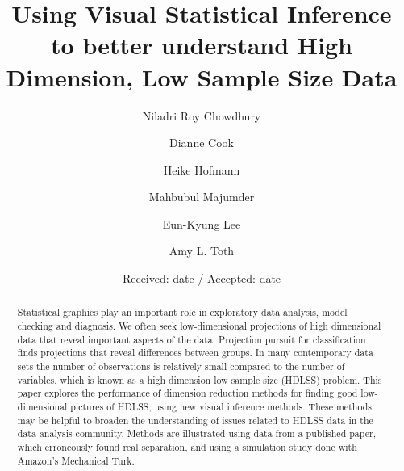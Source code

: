 \topmargin -0.10in   %
\textheight 8.5in  %






\title{Using Visual Statistical Inference to better understand High Dimension, Low Sample Size Data}\label{ch:largepsmalln}
\vspace{-0.8cm}
\author{Niladri Roy Chowdhury \and 
Dianne Cook \and
Heike Hofmann \and
Mahbubul Majumder \and
Eun-Kyung Lee \and
Amy L. Toth}


\date{Received: date / Accepted: date}

\maketitle

\begin{abstract}
Statistical graphics play an important role in exploratory data analysis, model checking and diagnosis. We often seek low-dimensional projections of high dimensional data that reveal important aspects of the data. Projection pursuit for classification finds projections that reveal differences between groups. In many contemporary data sets the number of observations is relatively small compared to the number of variables, which is known as a high dimension low sample size (HDLSS) problem. This paper explores the performance of dimension reduction methods for finding good low-dimensional pictures of HDLSS, using new visual inference methods. These methods may be helpful to broaden the understanding of issues related to HDLSS data in the data analysis community. Methods are illustrated using data from a published paper, which erroneously found real separation, and using a simulation study done with Amazon's Mechanical Turk.

\end{abstract}


